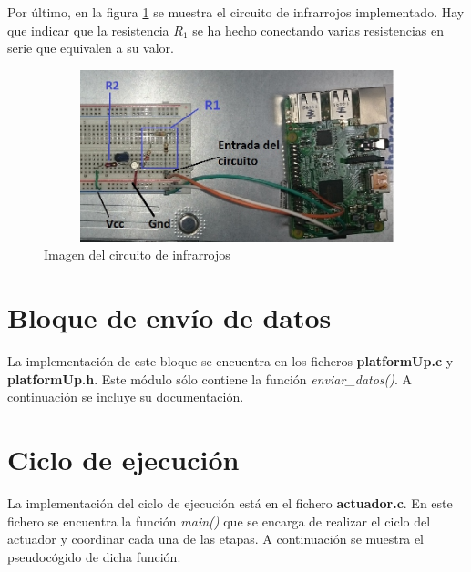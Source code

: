 Por último, en la figura \ref{circuitoIR} se muestra el circuito de infrarrojos implementado. Hay que indicar que la resistencia $R_{1}$ se ha hecho conectando varias resistencias en serie que equivalen a su valor. 

\begin{figure}[htbp]
	\centering
	\includegraphics[width=115mm, height=50mm]{imagenes/capitulo5/circuitoIR}
   	\caption{Imagen del circuito de infrarrojos}
   	\label{circuitoIR}
\end{figure}

\section{Bloque de envío de datos}\label{implementacion:envioDatos}

La implementación de este bloque se encuentra en los ficheros \textbf{platformUp.c} y \textbf{platformUp.h}. Este módulo sólo contiene la función \textit{enviar\_datos()}. A continuación se incluye su documentación.



\section{Ciclo de ejecución}\label{implemnetacion:actuador}

La implementación del ciclo de ejecución está en el fichero \textbf{actuador.c}. En este fichero se encuentra la función \textit{main()} que se encarga de realizar el ciclo del actuador y coordinar cada una de las etapas. A continuación se muestra el pseudocógido de dicha función.




